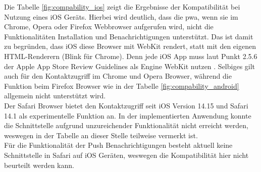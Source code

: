 
Die Tabelle \ref{fig:compability_ios} zeigt die Ergebnisse der Kompatibilität bei Nutzung eines iOS Geräts.
Hierbei wird deutlich, dass die \ac{pwa}, wenn sie im Chrome, Opera oder Firefox Webbrowser aufgerufen wird, nicht die Funktionalitäten Installation und Benachrichtigungen unterstützt.
Das ist damit zu begründen, dass iOS diese Browser mit WebKit rendert, statt mit den eigenen HTML-Renderern (\zB Blink für Chrome).
Denn jede iOS App muss laut Punkt 2.5.6 der Apple App Store Review Guidelines als Engine WebKit nutzen \cite{Apple.07.06.2021}.
Selbiges gilt auch für den Kontaktzugriff im Chrome und Opera Browser, während die Funktion beim Firefox Browser wie in der Tabelle \ref{fig:compability_android} allgemein nicht unterstützt wird.\\
Der Safari Browser bietet den Kontaktzugriff seit iOS Version 14.15 und Safari 14.1 als experimentelle Funktion an.
In der implementierten Anwendung konnte die Schnittstelle aufgrund unzureichender Funktionalität nicht erreicht werden, weswegen in der Tabelle an dieser Stelle \glqq teilweise\grqq{} vermerkt ist.\\
Für die Funktionalität der Push Benachrichtigungen besteht aktuell keine Schnittstelle in Safari auf iOS Geräten, weswegen die Kompatibilität hier nicht beurteilt werden kann.


